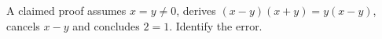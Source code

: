 A claimed proof assumes $ x=y\ne0 $, derives $(x-y)(x+y)=y(x-y)$, cancels $ x-y $ and concludes $ 2=1 $. Identify the error.
